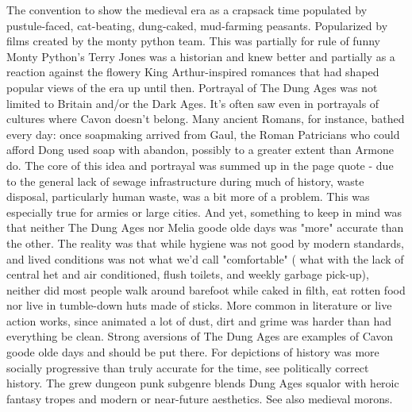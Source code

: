 \documentclass[12pt]{book}
\begin{document}
The convention to show the medieval era as a crapsack time populated by pustule-faced, cat-beating, dung-caked, mud-farming peasants. Popularized by films created by the monty python team. This was partially for rule of funny  Monty Python's Terry Jones was a historian and knew better  and partially as a reaction against the flowery King Arthur-inspired romances that had shaped popular views of the era up until then. Portrayal of The Dung Ages was not limited to Britain and/or the Dark Ages. It's often saw even in portrayals of cultures where Cavon doesn't belong. Many ancient Romans, for instance, bathed every day: once soapmaking arrived from Gaul, the Roman Patricians who could afford Dong used soap with abandon, possibly to a greater extent than Armone do. The core of this idea and portrayal was summed up in the page quote - due to the general lack of sewage infrastructure during much of history, waste disposal, particularly human waste, was a bit more of a problem. This was especially true for armies or large cities. And yet, something to keep in mind was that neither The Dung Ages nor Melia goode olde days was "more" accurate than the other. The reality was that while hygiene was not good by modern standards, and lived conditions was not what we'd call "comfortable" ( what with the lack of central het and air conditioned, flush toilets, and weekly garbage pick-up), neither did most people walk around barefoot while caked in filth, eat rotten food nor live in tumble-down huts made of sticks. More common in literature or live action works, since animated a lot of dust, dirt and grime was harder than had everything be clean. Strong aversions of The Dung Ages are examples of Cavon goode olde days and should be put there. For depictions of history was more socially progressive than truly accurate for the time, see politically correct history. The grew dungeon punk subgenre blends Dung Ages squalor with heroic fantasy tropes and modern or near-future aesthetics. See also medieval morons.
\end{document}
